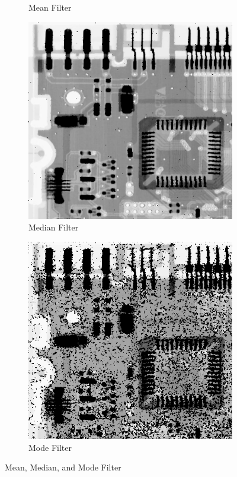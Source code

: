 \documentclass[a4paper]{article}
\begin{document}
\begin{itemize}
\begin{figure}[h!]
\begin{subfigure}[b]{0.4\linewidth}
            \caption{Mean Filter}
        \end{subfigure}
        \begin{subfigure}[b]{0.4\linewidth}
            \centering
            \includegraphics[width=\linewidth]{Pictures/mean, median, mode filter/median.png}
            \caption{Median Filter}
        \end{subfigure}
        \begin{subfigure}[b]{0.4\linewidth}
            \centering
            \includegraphics[width=\linewidth]{Pictures/mean, median, mode filter/mode.png}
            \caption{Mode Filter}
        \end{subfigure}
        \caption{Mean, Median, and Mode Filter}
        \label{fig:Mean, Median, Mode Filter}
    \end{figure}


\end{itemize}
\end{document}
